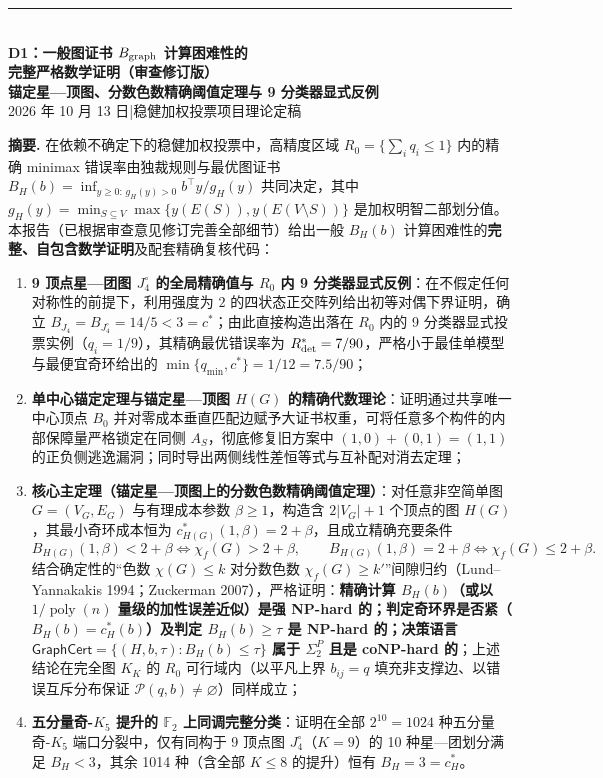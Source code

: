 \documentclass[11pt,a4paper]{ctexart}
\theoremstyle{definition}
\newcommand{\GraphCert}{\mathsf{GraphCert}}
\newcommand{\FF}{\mathbb F}
\newcommand{\1}{\boldsymbol 1}
\newcommand{\0}{\boldsymbol 0}
\newcommand{\chif}{\chi_f}
\begin{document}
\begin{center}
{\color{accent}\rule{\linewidth}{1.4pt}}\\[8mm]
{\Huge\bfseries D1：一般图证书 $B_{\rm graph}$ 计算困难性的\\[3mm]完整严格数学证明（审查修订版）}\\[5mm]
{\Large\bfseries 锚定星—顶图、分数色数精确阈值定理与 9 分类器显式反例}\\[6mm]
{\large 2026 年 10 月 13 日\quad|\quad 稳健加权投票项目理论定稿}
\end{center}

\vspace{3mm}
\begin{resultbox}
\textbf{摘要.} 在依赖不确定下的稳健加权投票中，高精度区域 $R_0=\{\sum_i q_i\le 1\}$ 内的精确 minimax 错误率由独裁规则与最优图证书 $B_H(b)=\inf_{y\ge 0:\,g_H(y)>0} b^\top y / g_H(y)$ 共同决定，其中 $g_H(y)=\min_{S\subseteq V}\max\{y(E(S)),y(E(V\setminus S))\}$ 是加权明智二部划分值。本报告（已根据审查意见修订完善全部细节）给出一般 $B_H(b)$ 计算困难性的\textbf{完整、自包含数学证明}及配套精确复核代码：
\begin{enumerate}[label=(\arabic*)]
\item \textbf{9 顶点星—团图 $J_4^\circ$ 的全局精确值与 $R_0$ 内 9 分类器显式反例}：在不假定任何对称性的前提下，利用强度为 $2$ 的四状态正交阵列给出初等对偶下界证明，确立 $\boxed{B_{J_4}=B_{J_4^\circ}=14/5<3=c^*}$；由此直接构造出落在 $R_0$ 内的 9 分类器显式投票实例（$q_i=1/9$），其精确最优错误率为 $R_{\rm det}^*=7/90$，严格小于最佳单模型与最便宜奇环给出的 $\min\{q_{\min},c^*\}=1/12=7.5/90$；
\item \textbf{单中心锚定定理与锚定星—顶图 $H(G)$ 的精确代数理论}：证明通过共享唯一中心顶点 $B_0$ 并对零成本垂直匹配边赋予大证书权重，可将任意多个构件的内部保障量严格锁定在同侧 $A_S$，彻底修复旧方案中 $(1,0)+(0,1)=(1,1)$ 的正负侧逃逸漏洞；同时导出两侧线性差恒等式与互补配对消去定理；
\item \textbf{核心主定理（锚定星—顶图上的分数色数精确阈值定理）}：对任意非空简单图 $G=(V_G,E_G)$ 与有理成本参数 $\beta\ge 1$，构造含 $2|V_G|+1$ 个顶点的图 $H(G)$，其最小奇环成本恒为 $c_{H(G)}^*(1,\beta)=2+\beta$，且成立精确充要条件
\[
 \boxed{B_{H(G)}(1,\beta) < 2+\beta \iff \chif(G) > 2+\beta,\qquad B_{H(G)}(1,\beta) = 2+\beta \iff \chif(G) \le 2+\beta.}
\]
结合确定性的“色数 $\chi(G)\le k$ 对分数色数 $\chif(G)\ge k'$”间隙归约（Lund--Yannakakis 1994；Zuckerman 2007），严格证明：\textbf{精确计算 $B_H(b)$（或以 $1/\operatorname{poly}(n)$ 量级的加性误差近似）是强 NP-hard 的；判定奇环界是否紧（$B_H(b)=c_H^*(b)$）及判定 $B_H(b)\ge\tau$ 是 NP-hard 的；决策语言 $\GraphCert=\{(H,b,\tau):B_H(b)\le\tau\}$ 属于 $\Sigma_2^P$ 且是 coNP-hard 的}；上述结论在完全图 $K_K$ 的 $R_0$ 可行域内（以平凡上界 $b_{ij}=q$ 填充非支撑边、以错误互斥分布保证 $\mathcal P(q,b)\neq\varnothing$）同样成立；
\item \textbf{五分量奇-$K_5$ 提升的 $\FF_2$ 上同调完整分类}：证明在全部 $2^{10}=1024$ 种五分量奇-$K_5$ 端口分裂中，仅有同构于 9 顶点图 $J_4^\circ$（$K=9$）的 10 种星—团划分满足 $B_H<3$，其余 1014 种（含全部 $K\le 8$ 的提升）恒有 $B_H=3=c_H^*$。
\end{enumerate}
\end{resultbox}
\end{document}
